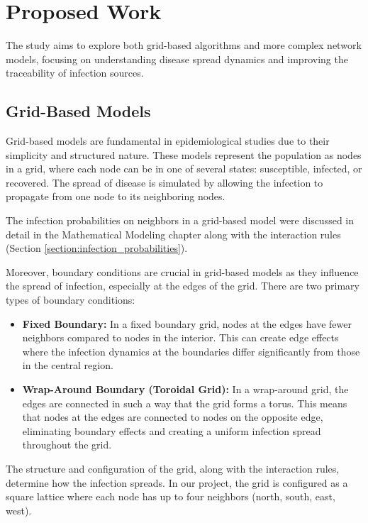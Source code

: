 \chapter{Proposed Work}

The study aims to explore both grid-based algorithms and more complex network models, focusing on understanding disease spread dynamics and improving the traceability of infection sources.

\section{Grid-Based Models}

Grid-based models are fundamental in epidemiological studies due to their simplicity and structured nature. These models represent the population as nodes in a grid, where each node can be in one of several states: susceptible, infected, or recovered. The spread of disease is simulated by allowing the infection to propagate from one node to its neighboring nodes.

The infection probabilities on neighbors in a grid-based model were discussed in detail in the Mathematical Modeling chapter along with the interaction rules (Section \ref{section:infection_probabilities}).

\label{section:boundary_conditions}
Moreover, boundary conditions are crucial in grid-based models as they influence the spread of infection, especially at the edges of the grid. There are two primary types of boundary conditions:
\begin{itemize}
    \item \textbf{Fixed Boundary:} In a fixed boundary grid, nodes at the edges have fewer neighbors compared to nodes in the interior. This can create edge effects where the infection dynamics at the boundaries differ significantly from those in the central region.
    \item \textbf{Wrap-Around Boundary (Toroidal Grid):} In a wrap-around grid, the edges are connected in such a way that the grid forms a torus. This means that nodes at the edges are connected to nodes on the opposite edge, eliminating boundary effects and creating a uniform infection spread throughout the grid.
\end{itemize}

The structure and configuration of the grid, along with the interaction rules, determine how the infection spreads. In our project, the grid is configured as a square lattice where each node has up to four neighbors (north, south, east, west).

